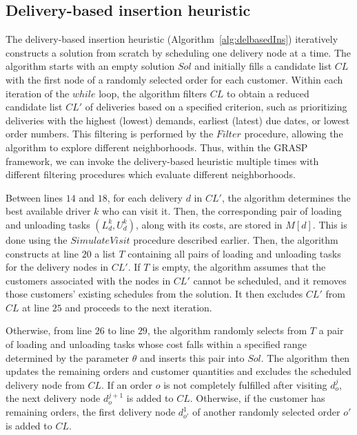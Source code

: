 \documentclass[authoryear,preprint,review,11pt]{elsarticle}
\begin{document}
\subsection{Delivery-based insertion heuristic}

The delivery-based insertion heuristic (Algorithm~\ref{alg:delbasedIns}) iteratively constructs a solution from scratch by scheduling one delivery node at a time. The algorithm starts with an empty solution $Sol$ and initially fills a candidate list $CL$ with the first node of a randomly selected order for each customer. Within each iteration of the $while$ loop, the algorithm filters $CL$ to obtain a reduced candidate list $CL'$ of deliveries based on a specified criterion, such as prioritizing deliveries with the highest (lowest) demands, earliest (latest) due dates, or lowest order numbers. This filtering is performed by the $Filter$ procedure, allowing the algorithm to explore different neighborhoods. Thus, within the GRASP framework, we can invoke the delivery-based heuristic multiple times with different filtering procedures which evaluate different neighborhoods. 

Between lines $14$ and $18$, for each delivery $d$ in $CL'$, the algorithm determines the best available driver $k$ who can visit it. Then, the corresponding pair of loading and unloading tasks $(L^k_d, U^k_d)$, along with its costs, are stored in $M[d]$. This is done using the $SimulateVisit$ procedure described earlier. Then, the algorithm constructs at line $20$ a list $T$ containing all pairs of loading and unloading tasks for the delivery nodes in $CL'$.
If $T$ is empty, the algorithm assumes that the customers associated with the nodes in $CL'$ cannot be scheduled, and it removes those customers' existing schedules from the solution. It then excludes $CL'$ from $CL$ at line $25$ and proceeds to the next iteration.

Otherwise, from line $26$ to line $29$, the algorithm randomly selects from $T$ a pair of loading and unloading tasks whose cost falls within a specified range determined by the parameter $\theta$ and inserts this pair into $Sol$. The algorithm then updates the remaining orders and customer quantities and excludes the scheduled delivery node from $CL$. If an order $o$ is not completely fulfilled after visiting $d^j_{o}$, the next delivery node $d^{j+1}_{o}$ is added to $CL$.  Otherwise, if the customer has remaining orders, the first delivery node $d^{1}_{o'}$ of another randomly selected order $o'$ is added to $CL$.
 
\end{document}
